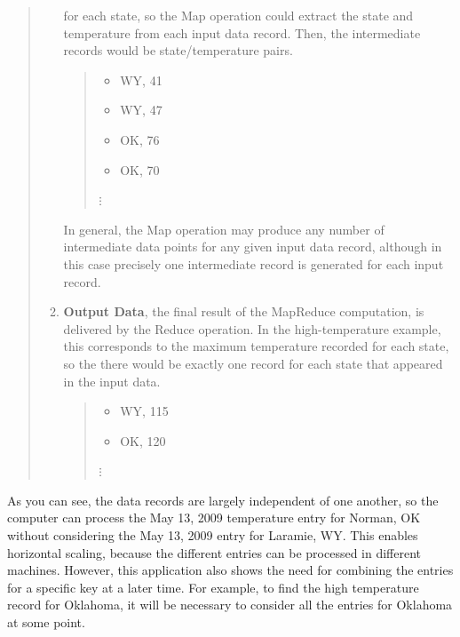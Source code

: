 \begin{quote}
\begin{enumerate}
        for each state, so the Map operation could extract
        the state and temperature from each input data record.
        Then, the intermediate records would be state/temperature pairs.
        \begin {quote}
        \begin{itemize}
            \item \textsf{WY, 41}
            \item \textsf{WY, 47}
            \item \textsf{OK, 76}
            \item \textsf{OK, 70}
        \end{itemize}
        \hspace*{1cm}$\vdots$
        \end{quote}
        In general, the Map operation may produce any number of intermediate
        data points for any given input data record, although in this case
        precisely one intermediate record is generated for each input record.
    \item \textbf{Output Data}, the final result of the MapReduce computation,
        is delivered by the Reduce operation.
        In the high-temperature example, this
        corresponds to the maximum temperature recorded for each state, so the
        there would be exactly one record for each state that appeared in the input data.
        \begin {quote}
        \begin{itemize}
            \item \textsf{WY, 115}
            \item \textsf{OK, 120}
        \end{itemize}
        \hspace*{1cm}$\vdots$
        \end{quote}
\end{enumerate}
\end{quote}
As you can see, the data records are largely independent of one another, so the computer
can process the May 13, 2009 temperature entry for Norman, OK without considering the
May 13, 2009 entry for Laramie, WY.  This enables horizontal scaling, because the
different entries can be processed in different machines.
However, this application also shows the need for combining
the entries for a specific key at a later time.  For example,
to find the high temperature record for Oklahoma, it will be
necessary to consider all the entries for Oklahoma at some
point.

